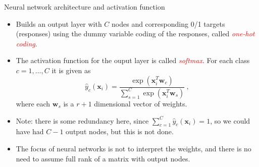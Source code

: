 \documentclass[10pt,ignorenonframetext,]{beamer}
\providecommand{\tightlist}{%
  \setlength{\itemsep}{0pt}\setlength{\parskip}{0pt}}
\begin{document}
\begin{frame}

\begin{block}{Neural network architecture and activation function}

\vspace{4mm}

\begin{itemize}
\tightlist
\item
  Builds an output layer with \(C\) nodes and corresponding 0/1 targets
  (responses) using the dummy variable coding of the responses, called
  \emph{\textcolor{red}{one-hot coding}}.
\end{itemize}

\vspace{2mm}

\begin{itemize}
\tightlist
\item
  The activation function for the ouput layer is called
  \emph{\textcolor{red}{softmax}}. For each class \(c=1,\ldots, C\) it
  is given as \[
  \hat{y}_c({\boldsymbol x}_i) = \frac{\exp({\boldsymbol x}_i^T{\boldsymbol w}_c)}{\sum_{s=1}^{C}\exp({\boldsymbol x}_i^T{\boldsymbol w}_s)} \ ,
  \] where each \({\boldsymbol w}_s\) is a \(r+1\) dimensional vector of
  weights.
\end{itemize}

\vspace{2mm}

\begin{itemize}
\tightlist
\item
  Note: there is some redundancy here, since
  \(\sum_{c=1}^C {\hat y}_{c}({\boldsymbol x}_i)=1\), so we could have
  had \(C-1\) output nodes, but this is not done.
\end{itemize}

\vspace{2mm}

\begin{itemize}
\tightlist
\item
  The focus of neural networks is not to interpret the weights, and
  there is no need to assume full rank of a matrix with output nodes.
\end{itemize}

\end{block}

\end{frame}
\end{document}
